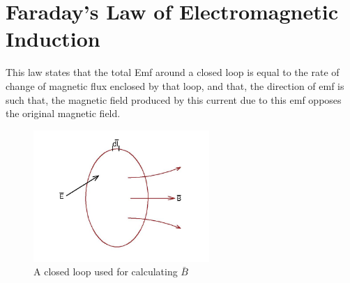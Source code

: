 \section{Faraday's Law of Electromagnetic Induction} 
This law states that the total Emf around a closed loop is equal to the rate of change of magnetic flux enclosed by that loop, and that, the direction of emf is such that, the magnetic field produced by this current due to this emf opposes the original magnetic field.
\begin{figure}[h]
\centering
\includegraphics[height=5cm]{./graphics/k}
\caption{A closed loop used for calculating $\bar{B}$}
\label{fig:k}
\end{figure}

